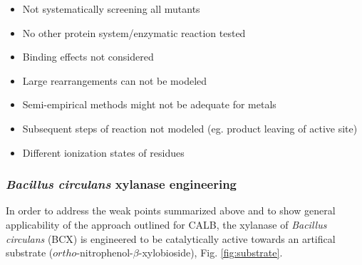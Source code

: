 {\begin{itemize}
\item Not systematically screening all mutants
\item No other protein system/enzymatic reaction tested
\item Binding effects not considered
\item Large rearrangements can not be modeled
\item Semi-empirical methods might not be adequate for metals
\item Subsequent steps of reaction not modeled (eg. product leaving of active site)
\item Different ionization states of residues
\end{itemize}
}

\newpage
\subsubsection{\textit{Bacillus circulans} xylanase engineering}
%
%
In order to address the weak points summarized above and to show general applicability of the approach outlined for CALB, the xylanase of \textit{Bacillus circulans} (BCX) is engineered to be catalytically active towards an artifical substrate ($ortho$-nitrophenol-$\beta$-xylobioside), Fig. \ref{fig:substrate}.
